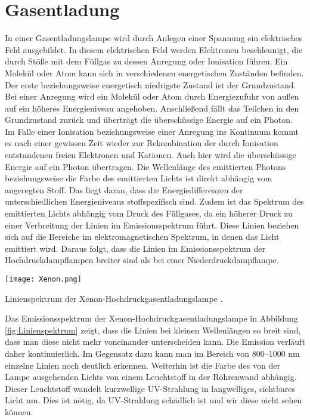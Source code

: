 \section{Gasentladung}

In einer Gasentladungslampe wird durch Anlegen einer Spannung ein elektrisches
Feld ausgebildet.
\cite{Gerthsen}
\cite{Light_sources}
\cite{CIUZ:Lichtquellen}
In diesem elektrischen Feld werden Elektronen beschleunigt, die durch Stöße mit dem Füllgas zu dessen Anregung oder Ionisation führen. Ein Molekül oder Atom kann sich in verschiedenen energetischen Zuständen befinden. Der erste beziehungsweise energetisch niedrigste Zustand ist der Grundzustand. Bei einer Anregung wird ein Molekül oder Atom durch Energiezufuhr von außen auf ein höheres Energieniveau angehoben. Anschließend fällt das Teilchen in den Grundzustand zurück und überträgt die überschüssige Energie auf ein Photon. Im Falle einer Ionisation beziehungsweise einer Anregung ins Kontinuum kommt es nach einer gewissen Zeit wieder zur Rekombination der durch Ionisation entstandenen freien Elektronen und Kationen. Auch hier wird die überschüssige Energie auf ein Photon übertragen.
Die Wellenlänge des emittierten Photons beziehungsweise die Farbe des emittierten Lichts ist direkt abhängig vom angeregten Stoff. Das liegt daran, dass die Energiedifferenzen der unterschiedlichen Energieniveaus stoffspezifisch sind. 
Zudem ist das Spektrum des emittierten Lichts abhängig vom Druck des Füllgases, da ein höherer Druck zu einer Verbreitung der Linien im Emissionsspektrum führt. Diese Linien beziehen sich auf die Bereiche im elektromagnetischen Spektrum, in denen das Licht emittiert wird. Daraus folgt, dass die Linien im Emissionsspektrum der Hochdruckdampflampen breiter sind als bei einer Niederdruckdampflampe.

\begin{dsafigure}
 \centering
 \texttt{[image: Xenon.png]}
 \caption{Linienspektrum der Xenon-Hochdruckgasentladungslampe
         \cite{XenonArcLamp_wikipedia}.
         }
 \label{fig:Linienspektrum}
\end{dsafigure}

Das Emissionsspektrum der Xenon-Hochdruckgasentladungslampe in Abbildung \ref{fig:Linienspektrum} zeigt, dass die Linien bei kleinen Wellenlängen so breit sind, dass man diese nicht mehr voneinander unterscheiden kann. Die Emission verläuft daher kontinuierlich. Im Gegensatz dazu kann man im Bereich von 800--1000 nm einzelne Linien noch deutlich erkennen.
Weiterhin ist die Farbe des von der Lampe ausgehenden Lichts von einem Leuchtstoff in der Röhrenwand abhängig. Dieser Leuchtstoff wandelt kurzwellige UV-Strahlung in langwelliges, sichtbares Licht um.
Dies ist nötig, da UV-Strahlung schädlich ist und wir diese nicht sehen können.
